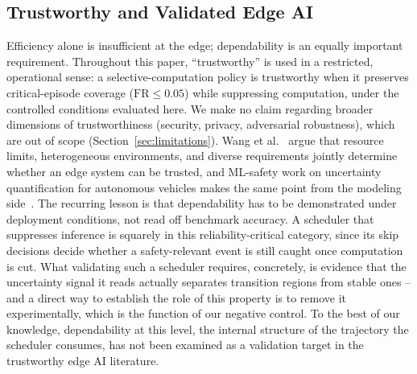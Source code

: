 \documentclass[a4paper,fleqn]{cas-dc}
\begin{document}
\subsection{Trustworthy and Validated Edge AI}
\label{sec:rel_trust}
Efficiency alone is insufficient at the edge; dependability is an equally important requirement.
{\color{\revcolor}Throughout this paper, ``trustworthy'' is used in a restricted,
operational sense: a selective-computation policy is trustworthy when it
preserves critical-episode coverage ($\mathrm{FR} \le 0.05$) while suppressing
computation, under the controlled conditions evaluated here. We make no claim
regarding broader dimensions of trustworthiness (security, privacy, adversarial
robustness), which are out of scope (Section~\ref{sec:limitations}).}
Wang et al.~\cite{wang2025trustworthy} argue that resource limits, heterogeneous
environments, and diverse requirements jointly determine whether an edge system can
be trusted, and ML-safety work on uncertainty quantification for autonomous vehicles
makes the same point from the modeling side~\cite{mcallister2017concrete,mohseni2020mlsafety,hendrycks2022mlsafety}.
The recurring lesson is that dependability has to be demonstrated under deployment
conditions, not read off benchmark accuracy. A scheduler that suppresses inference
is squarely in this reliability-critical category, since its skip decisions decide
whether a safety-relevant event is still caught once computation is cut. What
validating such a scheduler requires, concretely, is evidence that the uncertainty
signal it reads actually separates transition regions from stable ones -- and a direct way to establish the role of this property is to remove it experimentally, which is the function of our negative control. To the best of our knowledge, dependability at this level, the
internal structure of the trajectory the scheduler consumes, has not been examined
as a validation target in the trustworthy edge AI literature.
\end{document}

